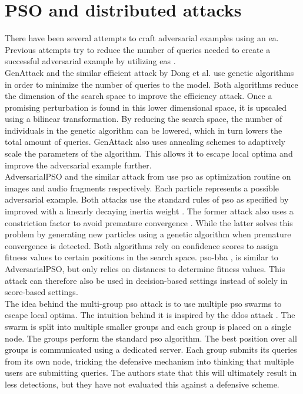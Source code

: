 \section{PSO and distributed attacks}\label{sec:pso_and_distributed_attacks}
There have been several attempts to craft adversarial examples using an \gls{ea}. Previous attempts try to reduce the number of queries needed to create a successful adversarial example by utilizing \glspl{ea} \cite{genattack,dong2019efficient,mosli2019they,audio_pso,distributed_pso_attack,suryanto2020}. \\

GenAttack \cite{genattack} and the similar efficient attack by Dong et al. \cite{dong2019efficient} use genetic algorithms in order to minimize the number of queries to the model. Both algorithms reduce the dimension of the search space to improve the efficiency attack. Once a promising perturbation is found in this lower dimensional space, it is upscaled using a bilinear transformation. By reducing the search space, the number of individuals in the genetic algorithm can be lowered, which in turn lowers the total amount of queries. GenAttack also uses annealing schemes to adaptively scale the parameters of the algorithm. This allows it to escape local optima and improve the adversarial example further. \\

AdversarialPSO \cite{mosli2019they} and the similar attack from \cite{audio_pso} use \gls{pso} as optimization routine on images and audio fragments respectively. Each particle represents a possible adversarial example. Both attacks use the standard rules of \gls{pso} as specified by \cite{pso} improved with a linearly decaying inertia weight \cite{inertia_weight}. The former attack also uses a constriction factor to avoid premature convergence \cite{constriction_factor}. While the latter solves this problem by generating new particles using a genetic algorithm when premature convergence is detected. Both algorithms rely on confidence scores to assign fitness values to certain positions in the search space. \gls{pso}-\gls{bba} \cite{distributed_pso_attack}, is similar to AdversarialPSO, but only relies on distances to determine fitness values. This attack can therefore also be used in decision-based settings instead of solely in score-based settings.\\

The idea behind the multi-group \gls{pso} attack \cite{suryanto2020} is to use multiple \gls{pso} swarms to escape local optima. The intuition behind it is inspired by the \gls{ddos} attack \cite{ddos}. The swarm is split into multiple smaller groups and each group is placed on a single node. The groups perform the standard \gls{pso} algorithm. The best position over all groups is communicated using a dedicated server. Each group submits its queries from its own node, tricking the defensive mechanism into thinking that multiple users are submitting queries. The authors state that this will ultimately result in less detections, but they have not evaluated this against a defensive scheme.\\
